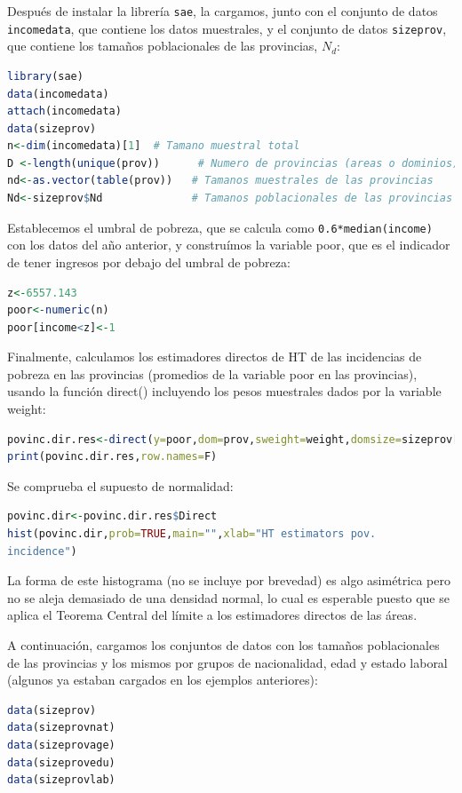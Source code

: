\documentclass[12pt,spanish]{article}
\begin{document}
Después de instalar la librería \texttt{sae}, la cargamos, junto con el conjunto de datos \texttt{incomedata}, que contiene los datos muestrales, y el conjunto de datos \texttt{sizeprov}, que contiene los tamaños poblacionales de las provincias, $N_d$:

\begin{lstlisting}[language=R]
library(sae) 
data(incomedata) 
attach(incomedata) 
data(sizeprov) 
n<-dim(incomedata)[1]  # Tamano muestral total 
D <-length(unique(prov))      # Numero de provincias (areas o dominios) 
nd<-as.vector(table(prov))   # Tamanos muestrales de las provincias 
Nd<-sizeprov$Nd              # Tamanos poblacionales de las provincias 
\end{lstlisting}

Establecemos el umbral de pobreza, que se calcula como \texttt{0.6*median(income)} con los datos del año anterior, y construímos la variable poor, que es el indicador de tener ingresos por debajo del umbral de 
pobreza:  
\begin{lstlisting}[language=R]
z<-6557.143 
poor<-numeric(n) 
poor[income<z]<-1    
\end{lstlisting}
Finalmente, calculamos los estimadores directos de HT de las incidencias de pobreza en las provincias (promedios de la variable poor en las provincias), usando la función direct() incluyendo los pesos muestrales dados por la variable weight:  
\begin{lstlisting}[language=R]
povinc.dir.res<-direct(y=poor,dom=prov,sweight=weight,domsize=sizeprov[,-1]) 
print(povinc.dir.res,row.names=F) 
\end{lstlisting}
Se comprueba el supuesto de normalidad:
\begin{lstlisting}[language=R]
povinc.dir<-povinc.dir.res$Direct 
hist(povinc.dir,prob=TRUE,main="",xlab="HT estimators pov. 
incidence")
\end{lstlisting}

La forma de este histograma (no se incluye por brevedad) es algo asimétrica pero no se aleja demasiado de una densidad normal, lo cual es esperable puesto que se aplica el Teorema Central del límite a los estimadores directos de las áreas. 

A continuación, cargamos los conjuntos de datos con los tamaños poblacionales de las provincias 
y los mismos por grupos de nacionalidad, edad y estado laboral (algunos ya estaban cargados en los 
ejemplos anteriores): 

\begin{lstlisting}[language=R]
data(sizeprov) 
data(sizeprovnat) 
data(sizeprovage) 
data(sizeprovedu) 
data(sizeprovlab)  
\end{lstlisting}
\end{document}
